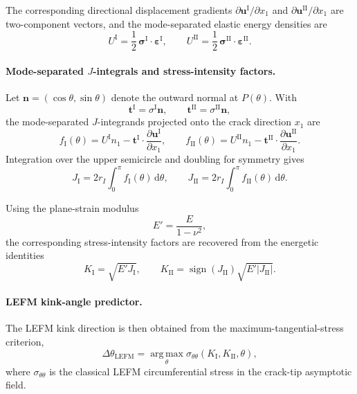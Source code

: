 \documentclass[smallextended]{svjour3}       %
\newcommand{\vb}[1]{\bm{#1}}      %
\renewcommand{\vec}[1]{\bm{#1}}    %
\newcommand{\tvec}{\vb{t}}
\newcommand{\uu}{\vb{u}}
\begin{document}
The corresponding directional displacement gradients
\(\partial\vb u^{\mathrm I}/\partial x_1\) and
\(\partial\vb u^{\mathrm{II}}/\partial x_1\) are two-component vectors, and
the mode-separated elastic energy densities are
\[
U^{\mathrm I}
=
\frac12\,\vb\sigma^{\mathrm I}\!\cdot\!\vb\varepsilon^{\mathrm I},
\qquad
U^{\mathrm{II}}
=
\frac12\,\vb\sigma^{\mathrm{II}}\!\cdot\!\vb\varepsilon^{\mathrm{II}}.
\]

\paragraph{Mode-separated \(J\)-integrals and stress-intensity factors.}
Let \(\vec{n}=(\cos\theta,\sin\theta)\) denote the outward normal at
\(P(\theta)\). With
\[
\tvec^{\mathrm I}=\sigma^{\mathrm I}\vec{n},
\qquad
\tvec^{\mathrm{II}}=\sigma^{\mathrm{II}}\vec{n},
\]
the mode-separated \(J\)-integrands projected onto the crack direction
\(x_1\) are
\[
f_{\mathrm I}(\theta)
=
U^{\mathrm I}n_1
-
\tvec^{\mathrm I}\cdot
\frac{\partial\uu^{\mathrm I}}{\partial x_1},
\qquad
f_{\mathrm{II}}(\theta)
=
U^{\mathrm{II}}n_1
-
\tvec^{\mathrm{II}}\cdot
\frac{\partial\uu^{\mathrm{II}}}{\partial x_1}.
\]
Integration over the upper semicircle and doubling for symmetry gives
\begin{equation}
	J_{\mathrm I}
	=
	2r_I\int_0^\pi f_{\mathrm I}(\theta)\,\mathrm d\theta,
	\qquad
	J_{\mathrm{II}}
	=
	2r_I\int_0^\pi f_{\mathrm{II}}(\theta)\,\mathrm d\theta.
	\label{eq:J_modes}
\end{equation}

Using the plane-strain modulus
\[
E'=\frac{E}{1-\nu^2},
\]
the corresponding stress-intensity factors are recovered from the energetic
identities
\begin{equation}
	K_{\mathrm I}=\sqrt{E'J_{\mathrm I}},
	\qquad
	K_{\mathrm{II}}
	=
	\operatorname{sign}(J_{\mathrm{II}})
	\sqrt{E'|J_{\mathrm{II}}|}.
	\label{eq:KIKII}
\end{equation}

\paragraph{LEFM kink-angle predictor.}
The LEFM kink direction is then obtained from the
maximum-tangential-stress criterion,
\begin{equation}
	\Delta\theta_{\mathrm{LEFM}}
	=
	\operatorname*{arg\,max}_{\theta}
	\sigma_{\theta\theta}(K_{\mathrm I},K_{\mathrm{II}},\theta),
	\label{eq:MTS}
\end{equation}
where \(\sigma_{\theta\theta}\) is the classical LEFM circumferential stress
in the crack-tip asymptotic field.
\end{document}

